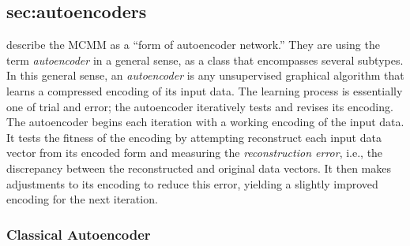 \subsection{sec:autoencoders}
\label{sec:autoencoders}
\citet[][p. 2]{dayan-and-zemel:95} describe the MCMM as a ``form of autoencoder network.'' 
They are using the term \emph{autoencoder} in a general sense, as a class that encompasses several subtypes.  
In this general sense, an \emph{autoencoder} is any unsupervised graphical algorithm that
 learns a compressed encoding of its input data. 
The learning process is essentially one of trial and error; the autoencoder iteratively tests and revises its encoding.  
The autoencoder begins each iteration with a working encoding of the input data. It tests the fitness of the encoding by attempting reconstruct each input data vector from its encoded form and measuring the \emph{reconstruction error}, i.e., the discrepancy between the reconstructed and original data vectors.  It then makes adjustments to its encoding to reduce this error, yielding a slightly improved encoding for the next iteration. 

\subsubsection{Classical Autoencoder}
\label{sec:classical-auto}

